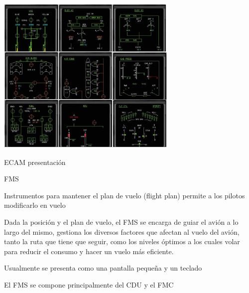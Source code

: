 \begin{frame}
  \begin{center}
    \includegraphics[width=0.65\textwidth]{imagenes/1.4.pantalla.electronica/ecam_airbus.jpg}

    \vspace{3mm}

    ECAM presentaci\'on
  \end{center}
\end{frame}

\begin{frame}

  \begin{block} { \ac{FMS}
}

    Instrumentos para mantener el plan de vuelo (flight plan) permite
    a los pilotos modificarlo en vuelo

    Dada la posici\'on y el plan de vuelo, el  \ac{FMS} se encarga de guiar
    el avi\'on a lo largo del mismo, gestiona los diversos factores
    que afectan al vuelo del avi\'on, tanto la ruta que tiene que
    seguir, como los niveles \'optimos a los cuales volar para reducir
    el consumo y hacer un vuelo m\'as eficiente.


    Usualmente se presenta como una pantalla peque\~na y un teclado

    El \ac{FMS} se compone principalmente del \ac{CDU} y 
    el \ac{FMC}
  \end{block}








\end{frame}

